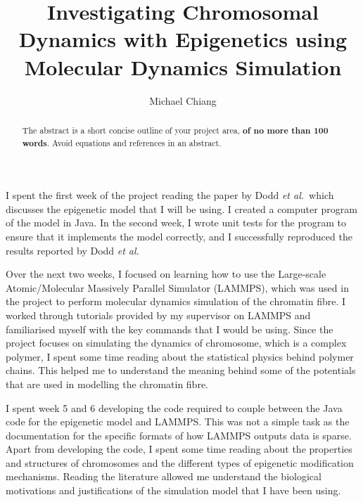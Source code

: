\documentclass[12pt]{article}
\newcommand{\etal}{\emph{et al.}}
\begin{document}
\title{Investigating Chromosomal Dynamics with Epigenetics using Molecular Dynamics Simulation} %
\author{Michael Chiang} %

\begin{abstract}
The abstract is a short concise outline of your project area, {\bf of no more than 100 words}. Avoid equations and references in an abstract. 
\end{abstract}

\maketitle

\personalstatement
I spent the first week of the project reading the paper by Dodd \etal~which discusses the epigenetic model that I will be using. I created a computer program of the model in Java. In the second week, I wrote unit tests for the program to ensure that it implements the model correctly, and I successfully reproduced the results reported by Dodd \etal

Over the next two weeks, I focused on learning how to use the Large-scale Atomic/Molecular Massively Parallel Simulator (LAMMPS), which was used in the project to perform molecular dynamics simulation of the chromatin fibre. I worked through tutorials provided by my supervisor on LAMMPS and familiarised myself with the key commands that I would be using. Since the project focuses on simulating the dynamics of chromosome, which is a complex polymer, I spent some time reading about the statistical physics behind polymer chains. This helped me to understand the meaning behind some of the potentials that are used in modelling the chromatin fibre. 

I spent week 5 and 6 developing the code required to couple between the Java code for the epigenetic model and LAMMPS. This was not a simple task as the documentation for the specific formats of how LAMMPS outputs data is sparse. Apart from developing the code, I spent some time reading about the properties and structures of chromosomes and the different types of epigenetic modification mechanisms. Reading the literature allowed me understand the biological motivations and justifications of the simulation model that I have been using. 
\end{document}
